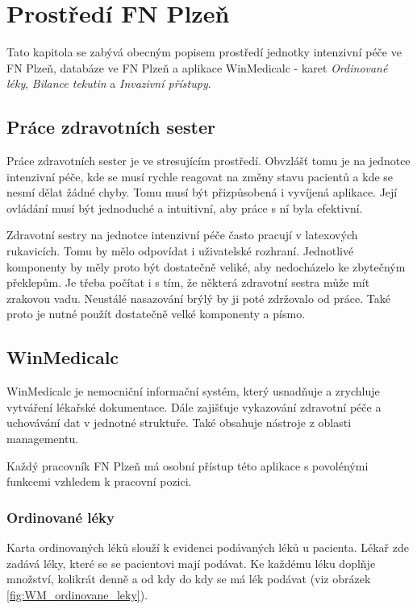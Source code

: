 \setlength{\parskip}{1em}

\chapter{Prostředí FN Plzeň}

Tato kapitola se zabývá obecným popisem prostředí jednotky intenzivní péče ve FN Plzeň, databáze ve FN Plzeň a aplikace WinMedicalc - karet \emph{Ordinované léky}, \emph{Bilance tekutin} a \emph{Invazivní přístupy}.

\section{Práce zdravotních sester}

Práce zdravotních sester je ve stresujícím prostředí. Obvzlášť tomu je na jednotce intenzivní péče, kde se musí rychle reagovat na změny stavu pacientů a kde se nesmí dělat žádné chyby. Tomu musí být přizpůsobená i vyvíjená aplikace. Její ovládání musí být jednoduché a intuitivní, aby práce s ní byla efektivní.

Zdravotní sestry na jednotce intenzivní péče často pracují v latexových rukavicích. Tomu by mělo odpovídat i uživatelské rozhraní. Jednotlivé komponenty by měly proto být dostatečně veliké, aby nedocházelo ke zbytečným překlepům. Je třeba počítat i s tím, že některá zdravotní sestra může mít zrakovou vadu. Neustálé nasazování brýlý by ji poté zdržovalo od práce. Také proto je nutné použít dostatečně velké komponenty a písmo.

\section{WinMedicalc}

WinMedicalc je nemocniční informační systém, který usnadňuje a zrychluje vytváření lékařské dokumentace. Dále zajišťuje vykazování zdravotní péče a uchovávání dat v jednotné struktuře. Také obsahuje nástroje z oblasti managementu.

Každý pracovník FN Plzeň má osobní přístup této aplikace s povolénými funkcemi vzhledem k pracovní pozici.

\subsection{Ordinované léky}

Karta ordinovaných léků slouží k evidenci podávaných léků u pacienta. Lékař zde zadává léky, které se se pacientovi mají podávat. Ke každému léku doplňje množství, kolikrát denně a od kdy do kdy se má lék podávat (viz obrázek \ref{fig:WM_ordinovane_leky}).

